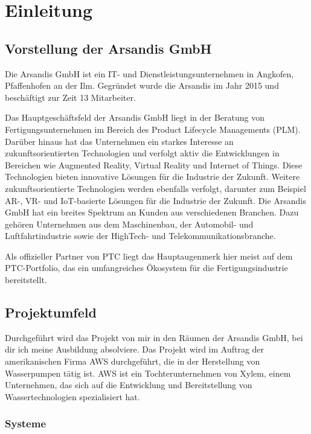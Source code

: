 \section{Einleitung}
\label{sec:Einleitung}

\subsection{Vorstellung der Arsandis GmbH}
\label{sec:Vorstellung_Arsandis}
Die Arsandis GmbH ist ein IT- und Dienstleistungsunternehmen in Angkofen, Pfaffenhofen an der Ilm.
Gegründet wurde die Arsandis im Jahr 2015 und beschäftigt zur Zeit 13 Mitarbeiter.

Das Hauptgeschäftsfeld der Arsandis GmbH liegt in der Beratung von Fertigungsunternehmen im Bereich des Product Lifecycle Managements (PLM).
Darüber hinaus hat das Unternehmen ein starkes Interesse an zukunftsorientierten Technologien und verfolgt aktiv die Entwicklungen in Bereichen wie Augmented Reality, Virtual Reality und Internet of Things.
Diese Technologien bieten innovative Lösungen für die Industrie der Zukunft.
Weitere zukunftsorientierte Technologien werden ebenfalls verfolgt, darunter zum Beispiel AR-, VR- und IoT-basierte Lösungen für die Industrie der Zukunft.
Die Arsandis GmbH hat ein breites Spektrum an Kunden aus verschiedenen Branchen.
Dazu gehören Unternehmen aus dem Maschinenbau, der Automobil- und Luftfahrtindustrie sowie der HighTech- und Telekommunikationsbranche.

Als offizieller Partner von PTC liegt das Hauptaugenmerk hier meist auf dem PTC-Portfolio, das ein umfangreiches Ökosystem für die Fertigungsindustrie bereitstellt.

\subsection{Projektumfeld}
\label{sec:Projektumfeld}
Durchgeführt wird das Projekt von mir in den Räumen der Arsandis GmbH, bei dir ich meine Ausbildung absolviere.
Das Projekt wird im Auftrag der amerikanischen Firma \ac{AWS} durchgeführt, die in der Herstellung von Wasserpumpen tätig ist.
\ac{AWS} ist ein Tochterunternehmen von Xylem, einem Unternehmen, das sich auf die Entwicklung und Bereitstellung von Wassertechnologien spezialisiert hat.

\subsubsection{Systeme}

